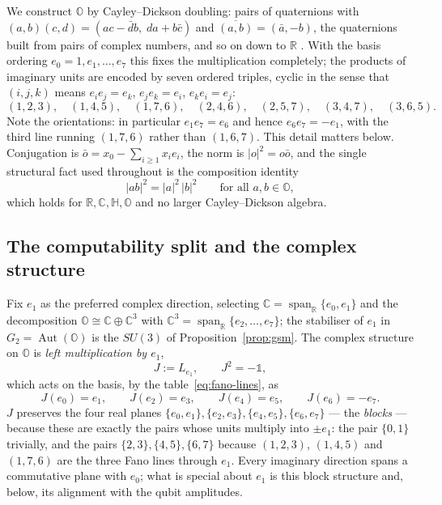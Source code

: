 We construct $\mathbb{O}$ by Cayley--Dickson doubling: pairs of quaternions with
$(a,b)(c,d) = (ac - \bar d b,\; da + b\bar c)$ and $\overline{(a,b)} = (\bar a, -b)$, the quaternions
built from pairs of complex numbers, and so on down to $\mathbb{R}$ \autocite{baez2002octonions}.
With the basis ordering $e_0 = 1, e_1, \dots, e_7$ this fixes the multiplication completely; the
products of imaginary units are encoded by seven ordered triples, cyclic in the sense that
$(i,j,k)$ means $e_ie_j = e_k$, $e_je_k = e_i$, $e_ke_i = e_j$:
\begin{equation}
  (1,2,3),\quad (1,4,5),\quad (1,7,6),\quad (2,4,6),\quad (2,5,7),\quad (3,4,7),\quad (3,6,5).
  \label{eq:fano-lines}
\end{equation}
Note the orientations: in particular $e_1e_7 = e_6$ and hence $e_6e_7 = -e_1$, with the third line
running $(1,7,6)$ rather than $(1,6,7)$. This detail matters below. Conjugation is
$\bar o = x_0 - \sum_{i\ge1}x_ie_i$, the norm is $|o|^2 = o\bar o$, and the single structural fact
used throughout is the composition identity
\begin{equation}
  |ab|^2 = |a|^2\,|b|^2 \qquad \text{for all } a,b\in\mathbb{O},
  \label{eq:composition}
\end{equation}
which holds for $\mathbb{R},\mathbb{C},\mathbb{H},\mathbb{O}$ and no larger Cayley--Dickson algebra.

\subsection{The computability split and the complex structure}

Fix $e_1$ as the preferred complex direction, selecting
$\mathbb{C} = \operatorname{span}_{\mathbb{R}}\{e_0,e_1\}$ and the decomposition
$\mathbb{O}\cong\mathbb{C}\oplus\mathbb{C}^3$ with
$\mathbb{C}^3 = \operatorname{span}_{\mathbb{R}}\{e_2,\dots,e_7\}$; the stabiliser of $e_1$ in
$G_2 = \operatorname{Aut}(\mathbb{O})$ is the $SU(3)$ of Proposition~\ref{prop:gsm}. The complex
structure on $\mathbb{O}$ is \emph{left multiplication by $e_1$},
\begin{equation}
  J := L_{e_1},\qquad J^2 = -\mathbb{1},
\end{equation}
which acts on the basis, by the table~\eqref{eq:fano-lines}, as
\begin{equation}
  J(e_0) = e_1,\qquad J(e_2) = e_3,\qquad J(e_4) = e_5,\qquad J(e_6) = -e_7.
  \label{eq:Jaction}
\end{equation}
$J$ preserves the four real planes
$\{e_0,e_1\},\{e_2,e_3\},\{e_4,e_5\},\{e_6,e_7\}$ --- the \emph{blocks} --- because these are
exactly the pairs whose units multiply into $\pm e_1$: the pair $\{0,1\}$ trivially, and the pairs
$\{2,3\},\{4,5\},\{6,7\}$ because $(1,2,3)$, $(1,4,5)$ and $(1,7,6)$ are the three Fano lines through
$e_1$. Every imaginary direction spans a commutative plane with $e_0$; what is special about $e_1$ is
this block structure and, below, its alignment with the qubit amplitudes.

